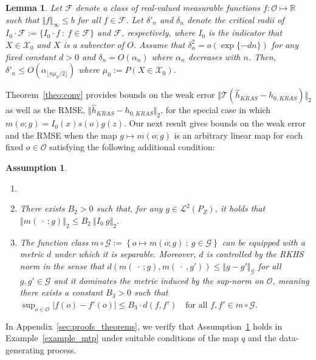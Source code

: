 \documentclass[twoside,11pt]{article}
\newtheorem{lemma}{Lemma}
\newtheorem{assumption}{Assumption}
\newcommand{\mc}{\mathcal}
\begin{document}
\begin{lemma}
  Let $\mc{F}$ denote a class of real-valued measurable functions $f:\mc{O}\mapsto\mathbb{R}$ such that $\Vert f\Vert_\infty\le b$ for all $f\in\mc{F}$. Let $\delta'_n$ and $\delta_n$ denote the critical radii of $I_0\cdot \mc{F}:=\{I_0\cdot f \::\: f\in\mc{F}\}$ and $\mc{F}$, respectively, where $I_0$ is the indicator that $X\in\mc{X}_0$ and $X$ is a subvector of $O$. Assume that $\delta_n^2=o(\exp\{-dn\})$ for any fixed constant $d>0$ and $\delta_n=O(\alpha_n)$ where $\alpha_n$ decreases with $n$. Then, $\delta'_n\le O(\alpha_{\lfloor n\mu_0/2\rfloor})$ where $\mu_0:=P(X\in\mc{X}_0)$.
    \label{lemma:crit_radius_I0G}
\end{lemma}

Theorem~\ref{theo:conv} provides bounds on the weak error $\Vert \mc{T}(\hat {h}_{KRAS}-h_{0,KRAS})\Vert_2$ as well as the RMSE, $\Vert \hat {h}_{KRAS}-h_{0,KRAS}\Vert_2$, for the special case in which $m(o;g)=I_0(x)s(o)g(z)$. Our next result gives bounds on the weak error and the RMSE when the map $g\mapsto m(o;g)$ is an arbitrary linear map for each fixed $o\in\mc{O}$ satisfying the following additional condition:

\begin{assumption}
\begin{enumerate}
\item[]
    \item 
    There exists $B_2>0$ such that, for any $g\in\mc{L}^2(P_{Z})$, it holds that $
\left\Vert m(\:\cdot\:;g)\right\Vert_2\le B_2 \: \left\Vert I_0 \:g\right\Vert_2.
$
\item The function class $
m\circ \mc{G}:=\left\{o \mapsto m(o;g)\::\:g\in\mc{G}\right\}$
can be equipped with a metric $d$ under which it is separable. Moreover, $d$ is controlled by the RKHS norm in the sense that $d(m(\:\cdot\:;g),m(\:\cdot\:,g'))\le \Vert g-g'\Vert_\mc{G}$ for all $g,g'\in\mc{G}$
and it dominates the metric induced by the sup-norm on $\mc{O}$, meaning there exists a constant $B_3>0$ such that
$
\sup_{o\in\mc{O}}|f(o)-f'(o)|\le B_3\cdot d(f,f')\quad\text{for all } f,f'\in m\circ\mc{G}.
$

\end{enumerate}
\label{ass:bounded}
\end{assumption}

In Appendix~\ref{sec:proofs_theorems}, we verify that Assumption~\ref{ass:bounded} holds in Example~\ref{example_mtp} under suitable conditions of the map $q$ and the data-generating process.
\end{document}
